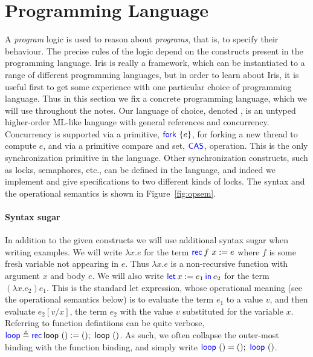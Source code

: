 \section{Programming Language}
\label{sec:setup}

A \emph{program} logic is used to reason about \emph{programs}, that is, to specify their behaviour.
The precise rules of the logic depend on the constructs present in the
programming language.
Iris is really a framework, which can be instantiated to a range of
different programming languages, but in order to learn about Iris,
it is useful first to get some experience with one particular choice of
programming language.
Thus in this section we fix a concrete programming language, which we will use throughout the notes.
Our language of choice, denoted  \proglang,
is an untyped higher-order ML-like language with general references and
concurrency.
Concurrency is supported via a primitive, $\Fork{e}$, for forking a
new thread to compute $e$, and
via a primitive compare and set, $\textsf{\color{blue} CAS}$, operation.
This is the only synchronization primitive in the language.
Other synchronization constructs, such as locks, semaphores, etc., can be defined in the language, and indeed we implement and give specifications to two different kinds of locks.
The syntax and the operational semantics is shown in
Figure~\ref{fig:opsem}.

\paragraph*{Syntax sugar}
In addition to the given constructs we will use additional syntax sugar when writing examples.
We will write $\lambda x . e$ for the term $\Rec{f} x = e$ where $f$ is some fresh variable not appearing in $e$.
Thus $\lambda x . e$ is a non-recursive function with argument $x$ and body $e$.
We will also write $\Let x = e_1 in e_2$ for the term $(\lambda x . e_2) e_1$.
This is the standard let expression, whose operational meaning (see the operational semantics below) is to evaluate the term $e_1$ to a value $v$, and then evaluate $e_2[v/x]$, \ie{} the term $e_2$ with the value $v$ substituted for the variable $x$.
Referring to function defintiions can be quite verbose, \eg\
$\langkw{loop} \mdef \Rec \textlang{loop} () = ();\ \textlang{loop}\ ()$.
As such, we often collapse the outer-most binding with the function binding,
and simply write $\langkw{loop}\ () = ();\ \langkw{loop}\ ()$.

